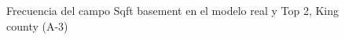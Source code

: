\begin{figure}[H]
    \centering
    
    \caption{Frecuencia del campo Sqft basement en el modelo real y Top 2, King county (A-3)}
    \label{frecuency-top2-sqft basement}
\end{figure}